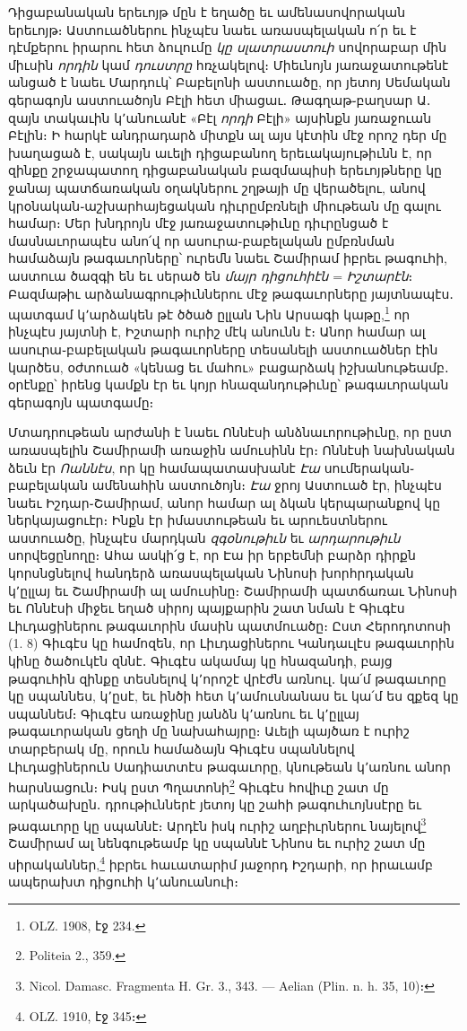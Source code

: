 \documentclass{article}
\begin{document}
{Դիցաբանական երեւոյթ մըն է եղածը եւ ամենասովորական երեւոյթ։ Աստուածներու ինչպէս նաեւ առասպելական ո՛ր եւ է դէմքերու իրարու հետ ձուլումը \emph{կը սլատրաստուի} սովորաբար մին միւսին \emph{որդին} կամ \emph{դուստրը} հռչակելով։ Միեւնոյն յառաջատութենէ անցած է նաեւ Մարդուկ՝ Բաբելոնի աստուածը, որ յետոյ Սեմական գերագոյն աստուածոյն Բէլի հետ միացաւ․ Թագղաթ֊բաղսար Ա․ զայն տակաւին կ՚անուանէ «Բէլ \emph{որդի} Բէլի» այսինքն յառաջուան Բէլին։ Ի հարկէ անդրադարձ միտքն ալ այս կէտին մէջ որոշ դեր մը խաղացաձ է, սակայն աւելի դիցաբանող երեւակայութիւնն է, որ զինքը շրջապատող դիցաբանական բազմապիսի երեւոյթները կը ջանայ պատճառական օղակներու շղթայի մը վերածելու, անով կրօնական֊աշխարհայեցական դիւրըմբռնելի միութեան մը գալու համար։ Մեր խնդրոյն մէջ յառաջատութիւնը դիւրընցած է մասնաւորապէս անո՛վ որ ասուրա֊բաբելական ըմբռնման համաձայն թագաւորները՝ ուրեմն նաեւ Շամիրամ իբրեւ թագուհի, աստուա ծազգի են եւ սերած են \emph{մայր դիցուհիէն} = \emph{Իշտարէն}։ Բազմաթիւ արձանագրութիւններու մէջ թագաւորները յայտնապէս․ պատգամ կ՚արձակեն թէ ծծած ըլլան Նին Արսագի կաթը,\footnote{OLZ. 1908, էջ 234.} որ ինչպէս յայտնի է, Իշտարի ուրիշ մէկ անունն է։ Անոր համար ալ ասուրա֊բաբելական թագաւորները տեսանելի աստուածներ էին կարծես, օժտուած «կենաց եւ մահու» բացարձակ իշխանութեամբ․ օրէնքը՝ իրենց կամքն էր եւ կոյր հնազանդութիւնը՝ թագաւորական գերագոյն պատգամը։

Մտադրութեան արժանի է նաեւ Ոննէսի անձնաւորութիւնը, որ ըստ առասպելին Շամիրամի առաջին ամուսինն էր։ Ոննէսի նախնական ձեւն էր \emph{Ոաննէս}, որ կը համապատասխանէ \emph{Էա} սումերական֊բաբելական ամենահին աստուծոյն։ \emph{Էա} ջրոյ Աստուած էր, ինչպէս նաեւ Իշդար֊Շամիրամ, անոր համար ալ ձկան կերպարանքով կը ներկայացուէր։ Ինքն էր իմաստութեան եւ արուեստներու աստուածը, ինչպէս մարդկան \emph{զգօնութիւն} եւ \emph{արդարութիւն} սորվեցընողը։ Ահա ասկի՛ց է, որ Էա իր երբեմնի բարձր դիրքն կորսնցնելով հանդերձ առասպելական Նինոսի խորհրդական կ՚ըլլայ եւ Շամիրամի ալ ամուսինը։ Շամիրամի պատճառաւ Նինոսի եւ Ոննէսի միջեւ եղած սիրոյ պայքարին շատ նման է Գիւգէս Լիւդացիներու թագաւորին մասին պատմուածը։ Ըստ Հերոդոտոսի (1. 8) Գիւգէս կը համոզեն, որ Լիւդացիներու Կանդաւլէս թագաւորին կինը ծածուկէն զննէ․ Գիւգէս ակամայ կը հնազանդի, բայց թագուհին զինքը տեսնելով կ՚որոշէ վրէժն առնուլ․ կա՛մ թագաւորը կը սպաննես, կ՚ըսէ, եւ ինծի հետ կ՚ամուսնանաս եւ կա՛մ ես զքեզ կը սպաննեմ։ Գիւգէս առաջինը յանձն կ՚առնու եւ կ՚ըլլայ թագաւորական ցեղի մը նախահայրը։ Աւելի պայծառ է ուրիշ տարբերակ մը, որուն համաձայն Գիւգէս սպաննելով Լիւդացիներուն Սադիատտէս թագաւորը, կնութեան կ՚առնու անոր հարսնացուն։ Իսկ ըստ Պղատոնի\footnote{Politeia 2., 359.} Գիւգէս հովիւը շատ մը արկածախըն․ դրութիւններէ յետոյ կը շահի թագուհւոյնսէրը եւ թագաւորը կը սպաննէ։ Արդէն իսկ ուրիշ աղբիւրներու նայելով\footnote{Nicol. Damasc. Fragmenta H. Gr. 3., 343. — Aelian (Plin. n. h. 35, 10)։} Շամիրամ ալ նենգութեամբ կը սպաննէ Նինոս եւ ուրիշ շատ մը սիրականներ,\footnote{OLZ. 1910, էջ 345։} իբրեւ հաւատարիմ յաջորդ Իշդարի, որ իրաւամբ ապերախտ դիցուհի կ՚անուանուի։

}
\end{document}
